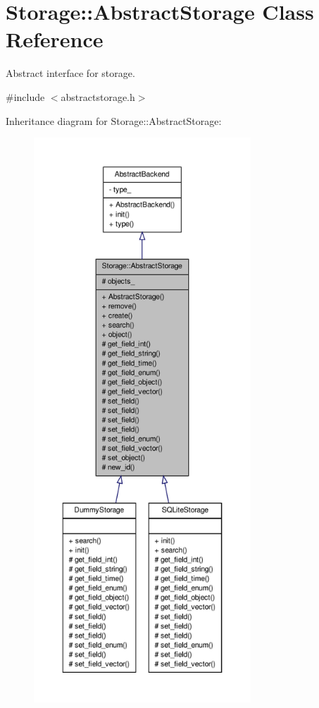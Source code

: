 \hypertarget{classStorage_1_1AbstractStorage}{
\section{Storage::AbstractStorage Class Reference}
\label{d6/da0/classStorage_1_1AbstractStorage}
}


Abstract interface for storage.  




{\ttfamily \#include $<$abstractstorage.h$>$}



Inheritance diagram for Storage::AbstractStorage:
\nopagebreak
\begin{figure}[H]
\begin{center}
\leavevmode
\includegraphics[height=600pt]{d9/db4/classStorage_1_1AbstractStorage__inherit__graph}
\end{center}
\end{figure}


